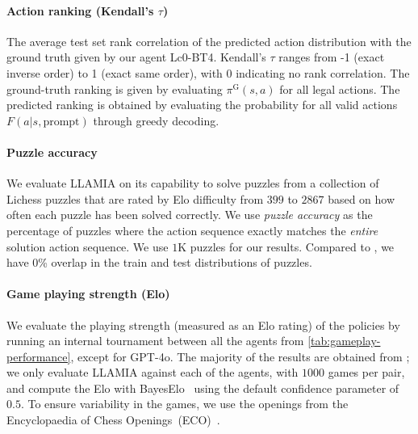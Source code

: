 \documentclass{article}
\theoremstyle{plain}
\theoremstyle{definition}
\theoremstyle{remark}
\begin{document}
\paragraph{Action ranking (Kendall's $\tau$)}
The average test set rank correlation of the predicted action distribution with the ground truth given by our agent Lc0-BT4. Kendall's $\tau$ ranges from -1 (exact inverse order) to 1 (exact same order), with 0 indicating no rank correlation. The ground-truth ranking is given by evaluating $\pi^\text{G}(s,a)$ for all legal actions. The predicted ranking is obtained by evaluating the probability for all valid actions $F(a|s, \text{prompt})$ through greedy decoding.

\paragraph{Puzzle accuracy}
We evaluate LLAMIA on its capability to solve puzzles from a collection of Lichess puzzles that are rated by Elo difficulty from $399$ to $2867$ based on how often each puzzle has been solved correctly. We use \emph{puzzle accuracy} as the percentage of puzzles where the action sequence exactly matches the \emph{entire} solution action sequence. We use $1$K puzzles for our results. Compared to \cite{ruoss2024grandmaster}, we have 0\% overlap in the train and test distributions of puzzles.

\paragraph{Game playing strength (Elo)}
We evaluate the playing strength (measured as an Elo rating) of the policies by running an internal tournament between all the agents from \cref{tab:gameplay-performance}, except for GPT-4o. The majority of the results are obtained from \cite{ruoss2024grandmaster}; we only evaluate LLAMIA against each of the agents, with $1000$ games per pair, and compute the Elo with BayesElo~\citep{coulom2008whole} using the default confidence parameter of $0.5$. To ensure variability in the games, we use the openings from the Encyclopaedia of Chess Openings~(ECO)~\citep{matanovic1978eco}.
\end{document}

